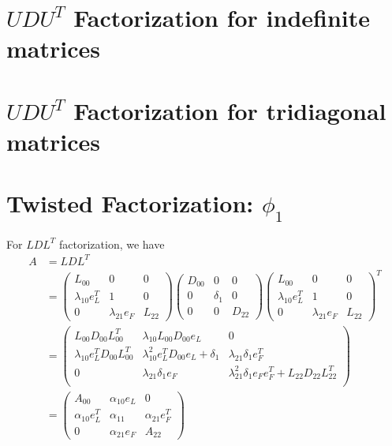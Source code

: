 \documentclass[11pt,a4paper]{article}
\begin{document}
\newpage
\section{$UDU^T$ Factorization for indefinite matrices}


\newpage
\section{$UDU^T$ Factorization for tridiagonal matrices}


\newpage
\section{Twisted Factorization: $\phi_1$}
\newcommand{\AAA}{\left( \begin{array}{ccc}
        A_{00} & \alpha_{10} e_L & 0 \\
        \alpha_{10} e_L^T & \alpha_{11} & \alpha_{21} e_F^T \\
        0 & \alpha_{21} e_F & A_{22}
    \end{array} \right)}
\newcommand{\LLL}{\left( \begin{array}{ccc}
        L_{00} & 0 & 0 \\
        \lambda_{10} e_L^T & 1 & 0 \\
        0 & \lambda_{21} e_F & L_{22}
    \end{array} \right)}
 \newcommand{\UUU}{\left( \begin{array}{ccc}
             U_{00} & v_{01}e_L & 0 \\
             0 & 1 & v_{21} e_F^T \\
             0 & 0 & U_{22}
    \end{array} \right)}
\newcommand{\DDD}{\left( \begin{array}{ccc}
        D_{00} & 0 & 0 \\
        0 & \delta_1 & 0 \\
        0 & 0 & D_{22}
    \end{array} \right)}
\newcommand{\EEE}{\left( \begin{array}{ccc}
        E_{00} & 0 & 0 \\
        0 & \epsilon_1 & 0 \\
        0 & 0 & E_{22}
    \end{array} \right)}
For $LDL^T$ factorization, we have 
\begin{align}
    A &= L D L^T \nonumber \\
    &= \LLL \DDD \LLL^T  \nonumber \\
    &= \left( \begin{array}{ccc}
            L_{00} D_{00} L_{00}^T & \lambda_{10} L_{00} D_{00} e_L & 0 \\
        \lambda_{10} e_L^T D_{00} L_{00}^T & \lambda_{10}^2 e_L^T D_{00} e_L +
        \delta_1 & \lambda_{21} \delta_1 e_F^T \\
        0 & \lambda_{21} \delta_{1} e_F & \lambda_{21}^2 \delta_1 e_F e_F^T +
        L_{22} D_{22} L_{22}^T \\
    \end{array} \right) \\
    & = \AAA
\end{align}
\end{document}
